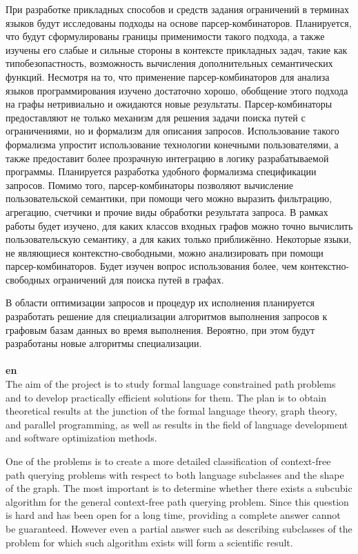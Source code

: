 \documentclass[12pt]{article}  %
\theoremstyle{remark}
\begin{document}
При разработке прикладных способов и средств задания ограничений в терминах языков будут исследованы подходы на основе парсер-комбинаторов. Планируется, что будут сформулированы границы применимости такого подхода, а также изучены его слабые и сильные стороны в контексте прикладных задач, такие как типобезопастность, возможность вычисления дополнительных семантических функций. Несмотря на то, что применение парсер-комбинаторов для анализа языков программирования изучено достаточно хорошо, обобщение этого подхода на графы нетривиально и ожидаются новые результаты. Парсер-комбинаторы предоставляют не только механизм для решения задачи поиска путей с ограничениями, но и формализм для описания запросов. Использование такого формализма упростит использование технологии конечными пользователями, а также предоставит более прозрачную интеграцию в логику разрабатываемой программы. Планируется разработка удобного формализма спецификации запросов. Помимо того, парсер-комбинаторы позволяют вычисление пользовательской семантики, при помощи чего можно выразить фильтрацию, агрегацию, счетчики и прочие виды обработки результата запроса. В рамках работы будет изучено, для каких классов входных графов можно точно вычислить пользовательскую семантику, а для каких только приближённо. Некоторые языки, не являющиеся контекстно-свободными, можно анализировать при помощи парсер-комбинаторов. Будет изучен вопрос использования более, чем контекстно-свободных ограничений для поиска путей в графах.

В области оптимизации запросов и процедур их исполнения планируется разработать решение для специализации алгоритмов выполнения запросов к графовым базам данных во время выполнения. Вероятно, при этом будут разработаны новые алгоритмы специализации.
\\
\\
\textbf{en}\\

The aim of the project is to study formal language constrained path problems and to develop practically efficient solutions for them. The plan is to obtain theoretical results at the junction of the formal language theory, graph theory, and parallel programming, as well as results in the field of language development and software optimization methods.

One of the problems is to create a more detailed classification of context-free path querying problems with respect to both language subclasses and the shape of the graph. The most important is to determine whether there exists a subcubic algorithm for the general context-free path querying problem. Since this question is hard and has been open for a long time, providing a complete answer cannot be guaranteed. However even a partial answer such as describing subclasses of the problem for which such algorithm exists will form a scientific result.
\end{document}

